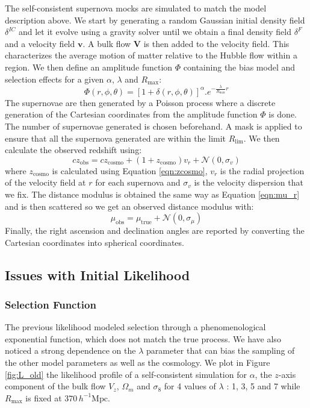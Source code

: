 The self-consistent supernova mocks are simulated to match the model description above. We start by generating a random Gaussian initial density field $\delta^{IC}$ and let it evolve 
using a gravity solver until we obtain a final density field $\delta^{F}$ and a velocity field $\mathbf{v}$. 
A bulk flow $\mathbf{V}$ is then added to the velocity field. This characterizes the average motion of matter relative to the Hubble flow within a region. 
We then define an amplitude function $\Phi$ containing the bias model and 
selection effects for a given $\alpha$, $\lambda$ and $R_{\text{max}}$:
\begin{equation}
    \Phi(r, \phi, \theta) = \left[1+ \delta(r, \phi, \theta)\right]^{\alpha}.e^{-\frac{\lambda}{R_{\text{max}}}r}
\end{equation}
The supernovae are then generated by a Poisson process where a discrete generation of the Cartesian coordinates from the amplitude function $\Phi$ is done. 
The number of supernovae generated is chosen beforehand. A mask is applied to ensure that all the supernova generated are within the limit $R_{\text{lim}}$. We then 
calculate the observed redshift using:
\begin{equation}
    cz_{\text{obs}} = cz_{\text{cosmo}} + (1+z_{\text{cosmo}})v_r + \mathcal{N}(0, \sigma_v)
\end{equation}
where $z_{\text{cosmo}}$ is calculated using Equation \ref{eqn:zcosmo}, $v_r$ is the radial projection of the velocity field at $r$ for each supernova and 
$\sigma_v$ is the velocity dispersion that we fix. 
The distance modulus 
is obtained the same way as Equation \ref{eqn:mu_r} and is then scattered so we get an observed distance modulus with:
\begin{equation}
    \mu_{\text{obs}} = \mu_{\text{true}} + \mathcal{N}(0, \sigma_{\mu})
\end{equation}
Finally, the right ascension and declination angles are reported by converting the Cartesian coordinates into spherical coordinates. \\

\subsection{Issues with Initial Likelihood}
\subsubsection{Selection Function}

The previous likelihood modeled selection through a phenomenological exponential function, which does not match the true process. 
We have also noticed a strong dependence on the $\lambda$ parameter that can bias the 
sampling of the other model parameters as well as the cosmology. We plot in Figure \ref{fig:L_old} the likelihood profile of a self-consistent simulation 
for $\alpha$, the $z$-axis component of the bulk flow $V_z$, $\Omega_m$ and $\sigma_8$ for 4 values of $\lambda$ : 1, 3, 5 and 7 while $R_{\text{max}}$ is 
fixed at $370 \, h^{-1}\text{Mpc}$. 

